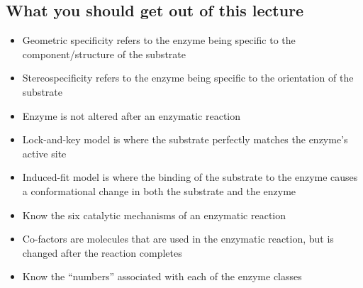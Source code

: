 \subsection*{What you should get out of this lecture}

\begin{itemize}
	\item Geometric specificity refers to the enzyme being specific  to the component/structure of the substrate
	\item Stereospecificity refers to the enzyme being specific to the orientation of the substrate
	\item Enzyme is not altered after an enzymatic reaction
	\item Lock-and-key model is where the substrate perfectly matches the enzyme's active site
	\item Induced-fit model is where the binding of the substrate to the enzyme causes a conformational change in both the substrate and the enzyme
	\item Know the six catalytic mechanisms of an enzymatic reaction
	\item Co-factors are molecules that are used in the enzymatic reaction, but is changed after the reaction completes
	\item Know the ``numbers'' associated with each of the enzyme classes
\end{itemize}

